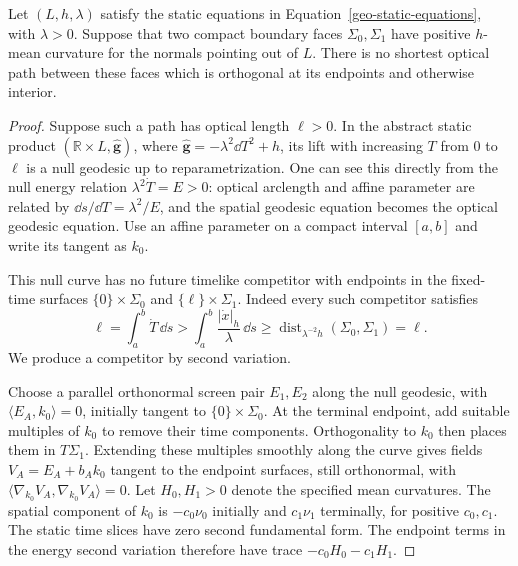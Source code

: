 \begin{lemma}
\label{geo-null-index-obstruction}
Let $(L,h,\lambda)$ satisfy the static equations in
Equation~\eqref{geo-static-equations}, with $\lambda>0$.  Suppose that two
compact boundary faces $\Sigma_0,\Sigma_1$ have positive $h$-mean curvature
for the normals pointing out of $L$.  There is no shortest optical path
between these faces which is orthogonal at its endpoints and otherwise
interior.
\end{lemma}
\begin{proof}
Suppose such a path has optical length $\ell>0$.  In the abstract static
product $(\mathbb R\times L,\widehat{\mathbf g})$, where
$\widehat{\mathbf g}=-\lambda^2\dd T^2+h$, its lift with increasing $T$
from $0$ to $\ell$ is a null geodesic up to reparametrization.  One can see
this directly from the null energy relation
$\lambda^2\dot T=E>0$: optical arclength and affine parameter are related by
$\dd s/\dd T=\lambda^2/E$, and the spatial geodesic equation becomes the
optical geodesic equation.  Use an affine parameter on a compact interval
$[a,b]$ and write its tangent as $k_0$.

This null curve has no future timelike competitor with endpoints in the
fixed-time surfaces
$\{0\}\times\Sigma_0$ and $\{\ell\}\times\Sigma_1$.  Indeed every such
competitor satisfies
\[
 \ell=\int_a^b\dot T\,\dd s
 >\int_a^b\frac{|\dot x|_h}{\lambda}\,\dd s
 \geq\operatorname{dist}_{\lambda^{-2}h}(\Sigma_0,\Sigma_1)=\ell.
\]
We produce a competitor by second variation.

Choose a parallel orthonormal screen pair $E_1,E_2$ along the null geodesic,
with $\langle E_A,k_0\rangle=0$, initially tangent to
$\{0\}\times\Sigma_0$.  At the terminal endpoint, add suitable multiples
of $k_0$ to remove their time components.  Orthogonality to $k_0$ then
places them in $T\Sigma_1$.  Extending these multiples smoothly along the
curve gives fields $V_A=E_A+b_Ak_0$ tangent to the endpoint surfaces, still
orthonormal, with
$\langle\nabla_{k_0}V_A,\nabla_{k_0}V_A\rangle=0$.
Let $H_0,H_1>0$ denote the specified mean curvatures.  The spatial component
of $k_0$ is $-c_0\nu_0$ initially and $c_1\nu_1$ terminally, for positive
$c_0,c_1$.  The static time slices have zero second fundamental form.  The
endpoint terms in the energy second variation therefore have trace
$-c_0H_0-c_1H_1$.


\end{proof}
